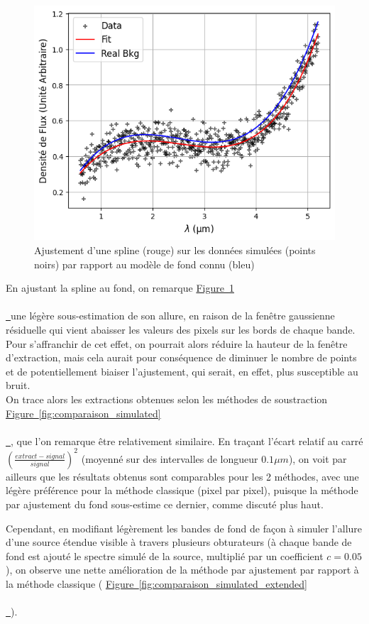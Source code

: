 \documentclass[12pt, a4paper]{article}
\newcommand*{\figref}[2][]{%
  \hyperref[{#2}]{%
    Figure~\ref*{#2}%
    \ifx\\#1\\%
    \else
      \,#1%
    \fi
  }%
}
\begin{document}
\begin{figure}
  \centering
  \includegraphics[scale=0.55]{assets/fit_simulated.png}
  \caption{Ajustement d'une spline (rouge) sur les données simulées (points noirs) par rapport au modèle de fond connu (bleu)}
  \label{fig:simulated_fit}
\end{figure}

En ajustant la spline au fond, on remarque \figref{fig:simulated_fit} une légère sous-estimation de son allure, en raison de la fenêtre gaussienne résiduelle qui vient abaisser les valeurs des pixels sur les bords de chaque bande. Pour s'affranchir de cet effet, on pourrait alors réduire la hauteur de la fenêtre d'extraction, mais cela aurait pour conséquence de diminuer le nombre de points et de potentiellement biaiser l'ajustement, qui serait, en effet, plus susceptible au bruit.\\

On trace alors les extractions obtenues selon les méthodes de soustraction \figref{fig:comparaison_simulated}, que l'on remarque être relativement similaire. En traçant l'écart relatif au carré $(\frac{extract - signal}{signal})^2$ (moyenné sur des intervalles de longueur $0.1 \mu m$), on voit par ailleurs que les résultats obtenus sont comparables pour les 2 méthodes, avec une légère préférence pour la méthode classique (pixel par pixel), puisque la méthode par ajustement du fond sous-estime ce dernier, comme discuté plus haut.

Cependant, en modifiant légèrement les bandes de fond de façon à simuler l'allure d'une source étendue visible à travers plusieurs obturateurs (à chaque bande de fond est ajouté le spectre simulé de la source, multiplié par un coefficient $c=0.05$), on observe une nette amélioration de la méthode par ajustement par rapport à la méthode classique (\figref{fig:comparaison_simulated_extended}).\\
\end{document}
